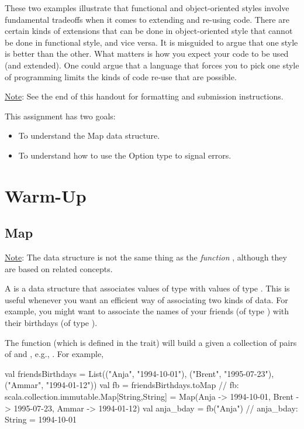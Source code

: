 \documentclass[9pt]{extbook}
\begin{document}
These two examples illustrate that functional
and object-oriented styles involve fundamental tradeoffs when it comes
to extending and re-using code. There are certain kinds of extensions
that can be done in object-oriented style that cannot be done in
functional style, and vice versa.  It is misguided to argue that
one style is better than the other. What matters is how you expect your code
to be used (and extended). One could argue that a language that forces you to
pick one style of programming limits the kinds of code re-use that are possible.


\underline{Note}: See the end of this handout for formatting and submission instructions.

This assignment has two goals:

\begin{itemize}
  \item To understand the Map data structure.
  \item To understand how to use the Option type to signal errors.
\end{itemize}

\section{Warm-Up}

\subsection{Map}

\underline{Note}: The data structure  is not the same thing as the \emph{function} , although they are based on related concepts.

A  is a data structure that associates values of type  with values of type .  This is useful whenever you want an efficient way of associating two kinds of data.  For example, you might want to associate the names of your friends (of type ) with their birthdays (of type ).

The  function (which is defined in the  trait) will build a  given a collection of pairs of  and , e.g., .  For example,

\begin{scalacode}
val friendsBirthdays = List(("Anja", "1994-10-01"), ("Brent", "1995-07-23"), ("Ammar", "1994-01-12"))
val fb = friendsBirthdays.toMap
// fb: scala.collection.immutable.Map[String,String] = Map(Anja -> 1994-10-01, Brent -> 1995-07-23, Ammar -> 1994-01-12)
val anja_bday = fb("Anja")
// anja_bday: String = 1994-10-01
\end{scalacode}
\end{document}
